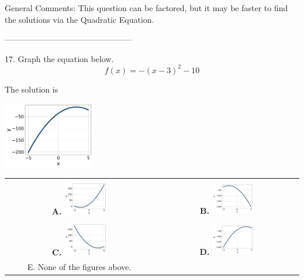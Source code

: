\documentclass{article}[14pt]
\begin{document}
General Comments: This question can be factored, but it may be faster to find the solutions via the Quadratic Equation.

-----------------------------------------------

17. Graph the equation below.
$$ f(x) = -(x-3)^2 - 10 $$ 

 
 The solution is  
 \begin{center} \includegraphics[width=0.3\textwidth]{../Figures/quadraticEquationToGraphDC.png} \end{center}\begin{tabular}{|c|c|} 
\hline 
 & \tabularnewline 
 \textbf{A.} \includegraphics[width=0.3\textwidth]{../Figures/quadraticEquationToGraphAC.png} & \textbf{B.} \includegraphics[width=0.3\textwidth]{../Figures/quadraticEquationToGraphBC.png} \tabularnewline 
\hline 
 & \tabularnewline 
 \textbf{C.} \includegraphics[width=0.3\textwidth]{../Figures/quadraticEquationToGraphCC.png} & \textbf{D.} \includegraphics[width=0.3\textwidth]{../Figures/quadraticEquationToGraphDC.png} \tabularnewline 
\hline 
 E. None of the figures above. & \tabularnewline 
\hline 
 \end{tabular} 
 
\end{document}
